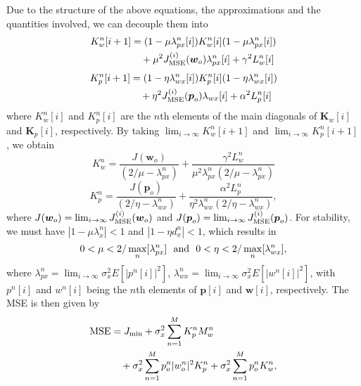 \documentclass[10pt,onecolumn]{IEEEtran}
\begin{document}
Due to the structure of the above equations, the approximations and
the quantities involved, we can decouple them into
\begin{equation}
\begin{split}
{K}_{w}^n [i+1] & = (1 - \mu { \lambda}_{px}^n[i]){K}_{w}^n [i] (1 -
\mu {\lambda}_{px}^n[i])
\\ & \quad + \mu^2 J_{\rm MSE}^{(i)}({\boldsymbol w}_{o})
{\lambda}_{px}^n[i] + \gamma^2 { L}_{w}^{n}[i]
\end{split}
\end{equation}
\begin{equation}
\begin{split}
{K}_{p}^n [i+1] & = (1 - \eta \lambda_{wx}^n[i]){
K}_{p}^n [i] (1 - \eta \lambda_{wx}^n[i]) \\
& \quad + \eta^2 J_{\rm MSE}^{(i)}({\boldsymbol p}_{o})
\lambda_{wx}[i] + \alpha^2 L_p^{n}[i]
\end{split}
\end{equation}
where $K_w^n[i]$ and $K_p^n[i]$ are the $n$th elements of the main
diagonals of ${\boldsymbol K}_w[i]$ and ${\boldsymbol K}_p[i]$,
respectively. By taking $\lim_{i \rightarrow \infty} K_{w}^n[i+1]$
and $\lim_{i \rightarrow \infty} K_{p}^n[i+1]$, we obtain
\begin{equation}
K_{w}^n = \frac{J({\boldsymbol w}_o)}{(2/\mu - \lambda_{px}^n)} +
\frac{\gamma^2 { L}_w^{n}}{\mu^2 \lambda_{px}^n(2/\mu -
\lambda_{px}^n)}
\end{equation}
\begin{equation}
K_{p}^n = \frac{J({\boldsymbol p}_o)}{(2/\eta - \lambda_{wx}^n)} +
\frac{\alpha^2 { L}_p^n}{\eta^2 \lambda_{wx}^n(2/\eta -
\lambda_{wx}^n)},
\end{equation}
where $J({\boldsymbol w}_o) = \lim_{i \rightarrow \infty} J_{\rm
MSE}^{(i)}({\boldsymbol w}_o)$ and $J({\boldsymbol p}_o) = \lim_{i
\rightarrow \infty} J_{\rm MSE}^{(i)}({\boldsymbol p}_o)$. For
stability, we must have $|1- \mu \lambda_{x}^n|<1$ and $|1-\eta
d_{x}^n | < 1$, which results in
\begin{equation}
0< \mu < 2/\max_{n} [\lambda_{px}^n] ~~{\rm and}~~0< \eta <
2/\max_{n} [\lambda_{wx}^n],
\end{equation}
where $\lambda_{px}^n = \lim_{i \rightarrow \infty} \sigma_x^2
E[|p^n[i]|^2]$, $\lambda_{wx}^n = \lim_{i \rightarrow \infty}
\sigma_x^2 E[|w^n[i]|^2]$, with $p^n[i]$ and $w^n[i]$ being the
$n$th elements of ${\boldsymbol p}[i]$ and ${\boldsymbol w}[i]$,
respectively. The MSE is then given by
\begin{equation}
\begin{split}
{\rm MSE} & = J_{\rm min} +  \sigma_x^2 \sum_{n=1}^M K_p^n   M_{w}^n  \\
& \quad+ \sigma_x^2 \sum_{n=1}^M   p_o^n |w_o^n|^2 K_{p}^n
 + \sigma_x^2 \sum_{n=1}^M p_o^n  K_{w}^n,
\label{mse_anal}
\end{split}
\end{equation}
\end{document}
